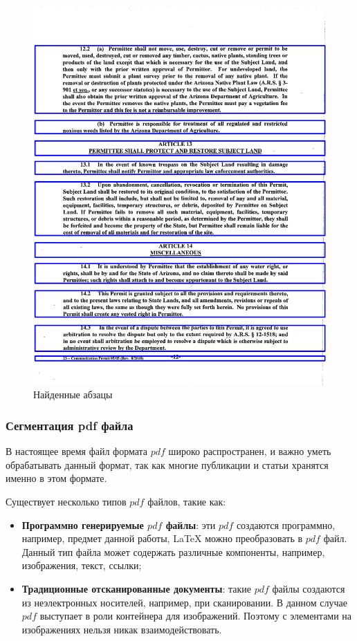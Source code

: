 \begin{figure}
    \includegraphics[scale=0.2]{img/paragraph/out.png}
    \caption{Найденные абзацы}
    \label{segmentation_output}
\end{figure}

\subsubsection{Сегментация pdf файла}
В настоящее время файл формата $pdf$ широко распространен, и важно уметь обрабатывать данный формат, так как многие публикации и статьи хранятся именно в этом формате.

Существует несколько типов $pdf$ файлов, такие как:
\begin{itemize}
    \item \textbf{Программно генерируемые $pdf$ файлы}: эти $pdf$ создаются программно, например, предмет данной работы, \LaTeX\; можно преобразовать в $pdf$ файл. Данный тип файла может содержать различные компоненты, например, изображения, текст, ссылки;
    \item \textbf{Традиционные отсканированные документы}: такие $pdf$ файлы создаются из неэлектронных носителей, например, при сканировании. В данном случае $pdf$ выступает в роли контейнера для изображений. Поэтому с элементами на изображениях нельзя никак взаимодействовать.
\end{itemize}


